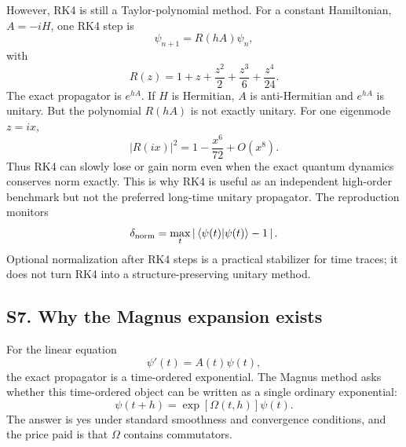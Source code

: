 \documentclass[aps,pra,preprint,superscriptaddress,nofootinbib]{revtex4-2}
\begin{document}
However, RK4 is still a Taylor-polynomial method. For a constant Hamiltonian, \(A=-iH\), one RK4 step is
\begin{equation}
\psi_{n+1}=R(hA)\psi_n,
\end{equation}
with
\begin{equation}
R(z)=1+z+\frac{z^2}{2}+\frac{z^3}{6}+\frac{z^4}{24}.
\end{equation}
The exact propagator is \(e^{hA}\). If \(H\) is Hermitian, \(A\) is anti-Hermitian and \(e^{hA}\) is unitary. But the polynomial \(R(hA)\) is not exactly unitary. For one eigenmode \(z=ix\),
\begin{equation}
|R(ix)|^2=1-\frac{x^6}{72}+O(x^8).
\end{equation}
Thus RK4 can slowly lose or gain norm even when the exact quantum dynamics conserves norm exactly. This is why RK4 is useful as an independent high-order benchmark but not the preferred long-time unitary propagator. The reproduction monitors
\begin{equation}
\delta_{\rm norm}=\max_t
\left|\,\langle\psi(t)|\psi(t)\rangle-1\,\right|.
\end{equation}
Optional normalization after RK4 steps is a practical stabilizer for time traces; it does not turn RK4 into a structure-preserving unitary method.

\subsection*{S7. Why the Magnus expansion exists}

For the linear equation
\begin{equation}
\psi'(t)=A(t)\psi(t),
\end{equation}
the exact propagator is a time-ordered exponential. The Magnus method asks whether this time-ordered object can be written as a single ordinary exponential:
\begin{equation}
\psi(t+h)=\exp[\Omega(t,h)]\psi(t).
\label{eq:s7-single-exp}
\end{equation}
The answer is yes under standard smoothness and convergence conditions, and the price paid is that \(\Omega\) contains commutators.
\end{document}
